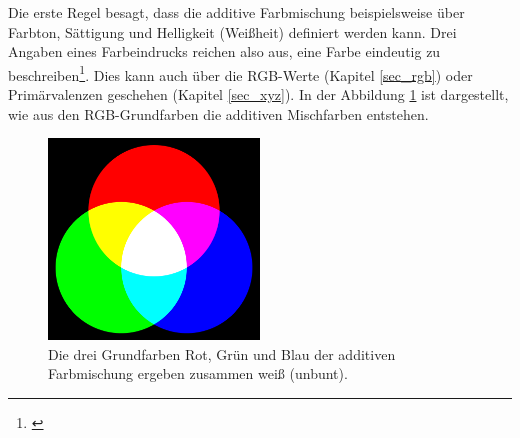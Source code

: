 Die erste Regel besagt, dass die additive Farbmischung beispielsweise über Farbton, Sättigung und Helligkeit (Weißheit) definiert werden kann. Drei Angaben eines Farbeindrucks reichen also aus, eine Farbe eindeutig zu beschreiben\footnote{\cite[105]{hentschel}}. Dies kann auch über die RGB-Werte (Kapitel \ref{sec_rgb}) oder Primärvalenzen geschehen (Kapitel \ref{sec_xyz}). In der Abbildung \ref{b_farben+} ist dargestellt, wie aus den RGB-Grundfarben die additiven Mischfarben entstehen.

\begin{figure}[H]     %
\centering
\includegraphics[width=0.5\textwidth]{bilder/farben+} 
\caption {Die drei Grundfarben Rot, Grün und Blau der additiven Farbmischung ergeben zusammen weiß (unbunt).\protect\footnotemark}\label{b_farben+}
\end{figure}

